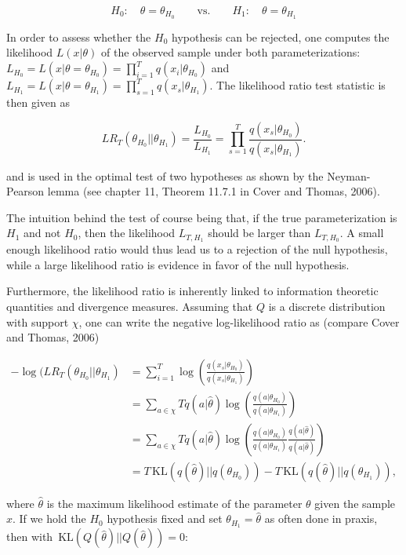 \documentclass[11pt,]{article}
\newcommand{\KL}{\,\text{KL}}
\begin{document}
\[
H_0: \quad \theta = \theta_{H_0} \qquad \text{vs.} \qquad H_1: \quad \theta = \theta_{H_1}
\]

In order to assess whether the \(H_0\) hypothesis can be rejected, one
computes the likelihood \(L(x|\theta)\) of the observed sample under
both parameterizations:
\(L_{H_0} = L(x|\theta = \theta_{H_0}) = \prod_{i=1}^T q(x_i|\theta_{H_0})\)
and
\(L_{H_1} = L(x|\theta = \theta_{H_1}) = \prod_{s=1}^T q(x_s|\theta_{H_1})\).
The likelihood ratio test statistic is then given as

\[
LR_T(\theta_{H_0}|| \theta_{H_1}) = \frac{L_{H_0}}{L_{H_1}} = \prod_{s=1}^T\frac{q(x_s|\theta_{H_0})}{ q(x_s|\theta_{H_1})}.
\]

and is used in the optimal test of two hypotheses as shown by the
Neyman-Pearson lemma (see chapter 11, Theorem 11.7.1 in Cover and
Thomas, 2006).

The intuition behind the test of course being that, if the true
parameterization is \(H_1\) and not \(H_0\), then the likelihood
\(L_{T,H_1}\) should be larger than \(L_{T,H_0}\). A small enough
likelihood ratio would thus lead us to a rejection of the null
hypothesis, while a large likelihood ratio is evidence in favor of the
null hypothesis.

Furthermore, the likelihood ratio is inherently linked to information
theoretic quantities and divergence measures. Assuming that \(Q\) is a
discrete distribution with support \(\chi\), one can write the negative
log-likelihood ratio as (compare Cover and Thomas, 2006)

\begin{align*}
-\log(LR_T(\theta_{H_0}|| \theta_{H_1}) & = \sum_{i=1}^T \log(\frac{q(x_s|\theta_{H_0})}{ q(x_s|\theta_{H_1})}) \\
& = \sum_{a \in \chi} T q(a|\hat{\theta}) \log(\frac{q(a|\theta_{H_0})}{ q(a|\theta_{H_1})}) \\
& = \sum_{a \in \chi} T q(a|\hat{\theta}) \log(\frac{q(a|\theta_{H_0})}{ q(a|\theta_{H_1})}\frac{q(a|\hat{\theta})}{ q(a|\hat{\theta})}) \\
& = T \KL(q(\hat{\theta})||q(\theta_{H_0})) - T \KL(q(\hat{\theta})||q(\theta_{H_1})),
\end{align*}

where \(\hat{\theta}\) is the maximum likelihood estimate of the
parameter \(\theta\) given the sample \(x\). If we hold the \(H_0\)
hypothesis fixed and set \(\theta_{H_1} = \hat{\theta}\) as often done
in praxis, then with \(\KL(Q(\hat{\theta})||Q(\hat{\theta})) = 0\):
\end{document}
